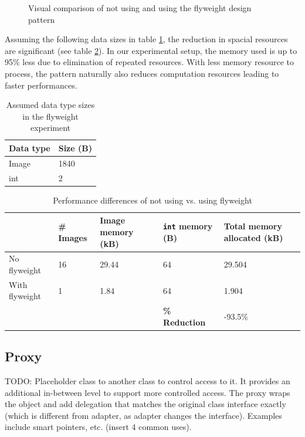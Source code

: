 \begin{multicols}{2}
\begin{figure}[H]
	\caption{Visual comparison of not using and using the flyweight design pattern}
	\label{fig:flyweight}
\end{figure}

Assuming the following data sizes in table \ref{table:flyweight-datasize}, the reduction in spacial resources are significant (see table \ref{table:flyweight-optimization}). In our experimental setup, the memory used is up to 95\% less due to elimination of repeated resources. With less memory resource to process, the pattern naturally also reduces computation resources leading to faster performances.

\begin{table}[H]
    \centering
    \begin{tabular}{ll}
    Data type & Size (B) \\ \hline
    Image     & 1840     \\
    int       & 2       
    \end{tabular}
    \caption{Assumed data type sizes in the flyweight experiment}
    \label{table:flyweight-datasize}
\end{table}

\iftwocolumns
\end{multicols}
\fi
\begin{table}[H]
    \centering
    \begin{tabular}{lllll}
    & \# Images & Image memory (kB) & \texttt{int} memory (B) & Total memory allocated (kB)\\ \hline
    No flyweight & 16 & 29.44 & 64 & 29.504 \\
    With flyweight & 1 & 1.84 & 64 & 1.904 \\ \hline
    & & & \textbf{\% Reduction} & -93.5\% \\
    \end{tabular}
    \caption{Performance differences of not using vs. using flyweight}
    \label{table:flyweight-optimization}
\end{table}
\iftwocolumns
\begin{multicols}{2}
\fi

\subsection{Proxy}
TODO: Placeholder class to another class to control access to it. It provides an additional in-between level to support more controlled access. The proxy wraps the object and add delegation that matches the original class interface exactly (which is different from adapter, as adapter changes the interface). Examples include smart pointers, etc. (insert 4 common uses).


\iftwocolumns
\end{multicols}
\fi